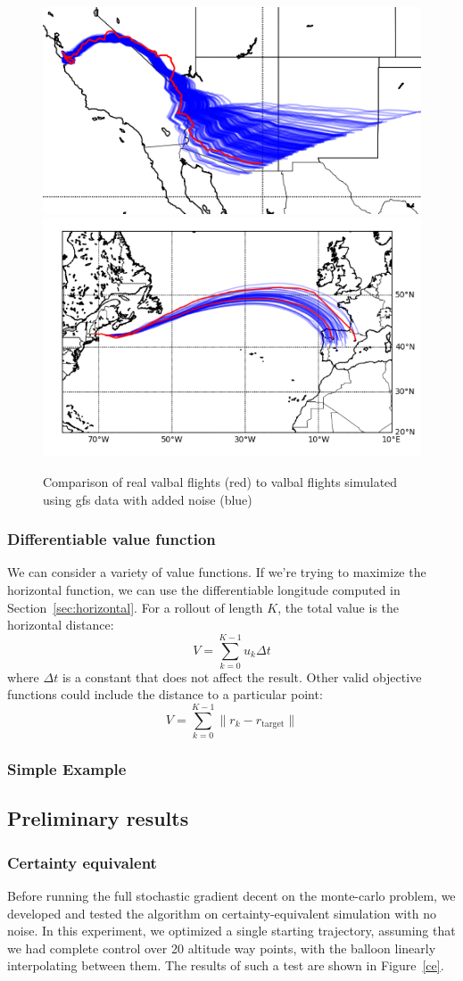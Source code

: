 \documentclass[11pt]{scrartcl} %
\begin{document}
\begin{figure}[h]
\includegraphics[width=0.45\linewidth]{winds.png}
\includegraphics[width=0.45\linewidth]{spain.png}
\caption{Comparison of real valbal flights (red) to valbal flights simulated using gfs data with added noise (blue)}
\label{winds}
\end{figure}

\subsubsection{Differentiable value function}
We can consider a variety of value functions. If we're trying to maximize the horizontal function, we can use the differentiable longitude computed in Section~\ref{sec:horizontal}. For a rollout of length $K$, the total value is the horizontal distance:
\begin{equation}
V = \sum_{k=0}^{K-1} u_k \Delta t\label{eqn:value}
\end{equation}
where $\Delta t$ is a constant that does not affect the result. Other valid objective functions could include the distance to a particular point:
\[V = \sum_{k=0}^{K-1} \lVert r_k - r_\text{target}\rVert\]


\subsubsection{Simple Example}

\newpage
\subsection{Preliminary results}
\subsubsection{Certainty equivalent}
Before running the full stochastic gradient decent on the monte-carlo problem, we developed and tested the algorithm on certainty-equivalent simulation with no noise. In this experiment, we optimized a single starting trajectory, assuming that we had complete control over 20 altitude way points, with the balloon linearly interpolating between them. The results of such a test are shown in Figure~\ref{ce}. 
\end{document}
